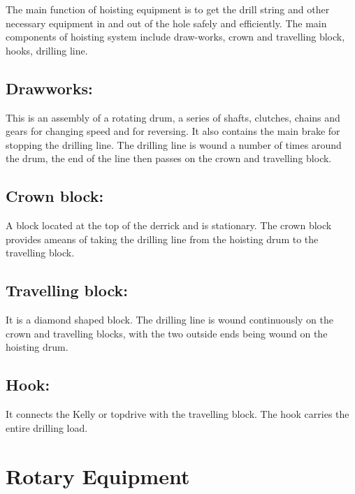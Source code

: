 The main function of hoisting equipment is to get the drill string and 
other necessary equipment in and out of the hole safely and efficiently. 
The main components of hoisting system include draw-works, crown and travelling block, hooks, drilling line.

\vspace{1em}

\subsection*{\textbf{Drawworks:}} This is an assembly of a rotating drum, a series of shafts, 
clutches, chains and gears for changing speed and for reversing.
 It also contains the main brake for stopping the drilling line. 
The drilling line is wound a number of times around the drum, 
the end of the line then passes on the crown and travelling block.

\vspace{1em}

\subsection*{\textbf{Crown block:}} A block located at the top of the derrick and is stationary.
 The crown block provides ameans of taking the drilling line from the hoisting drum to the travelling block.

\vspace{1em}

\subsection*{\textbf{Travelling block:}} It is a diamond shaped block. 
The drilling line is wound continuously on the crown and travelling blocks,
 with the two outside ends being wound on the hoisting drum.

\vspace{1em}

\subsection*{\textbf{Hook:}} It connects the Kelly or topdrive with the travelling block. The hook carries the entire drilling load.

\section*{Rotary Equipment}


